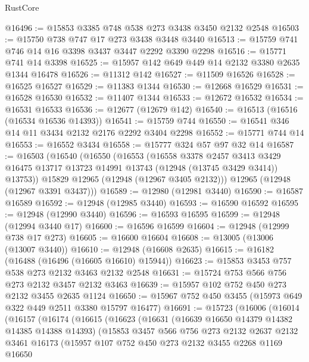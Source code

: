\begin{lexlean}{RustCore}
\begin{coremodule}
@16496 := @15853 @3385 @748 @538 @273 @3438 @3450 @2132 @2548
@16503 := @15750 @738 @747 @17 @273 @3438 @3448 @3440
@16513 := @15759 @741 @746 @14 @16 @3398 @3437 @3447 @2292 @3390 @2298
@16516 := @15771 @741 @14 @3398
@16525 := @15957 @142 @649 @449 @14 @2132 @3380 @2635 @1344 @16478
@16526 := @11312 @142
@16527 := @11509 @16526
@16528 := @16525 @16527
@16529 := @11383 @1344
@16530 := @12668 @16529
@16531 := @16528 @16530
@16532 := @11407 @1344
@16533 := @12672 @16532
@16534 := @16531 @16533
@16536 := @12677 (@12679 @142)
@16540 := @16513 (@16516 (@16534 @16536 @14393))
@16541 := @15759 @744
@16550 := @16541 @346 @14 @11 @3434 @2132 @2176 @2292 @3404 @2298
@16552 := @15771 @744 @14
@16553 := @16552 @3434
@16558 := @15777 @324 @57 @97 @32 @14
@16587 := @16503
    (@16540
      (@16550
        (@16553
          (@16558
            @3378
            @2457
            @3413
            @3429
            @16475
            @13717
            @13723
            @14991
            @13743
            (@12948 (@13745 @3429 @3414))
            @13753))
        @15829
        @12965
        (@12948 (@12967 @3405 @2132)))
      @12965
      (@12948 (@12967 @3391 @3437)))
@16589 := @12980 (@12981 @3440)
@16590 := @16587 @16589
@16592 := @12948 (@12985 @3440)
@16593 := @16590 @16592
@16595 := @12948 (@12990 @3440)
@16596 := @16593 @16595
@16599 := @12948 (@12994 @3440 @17)
@16600 := @16596 @16599
@16604 := @12948 (@12999 @738 @17 @273)
@16605 := @16600 @16604
@16608 := @13005 (@13006 (@13007 @3440))
@16610 := @12948 (@16608 @2635)
@16615 := @16182 (@16488 (@16496 (@16605 @16610) @15944))
@16623 := @15853 @3453 @757 @538 @273 @2132 @3463 @2132 @2548
@16631 := @15724 @753 @566 @756 @273 @2132 @3457 @2132 @3463
@16639 := @15957 @102 @752 @450 @273 @2132 @3455 @2635 @1124
@16650 := @15967 @752 @450 @3455 (@15973 @649 @322 @449 @2511 @3380 @15797 @16477)
@16691 := @15723
    (@16006
      (@16014
        (@16157
          (@16174
            (@16615
              (@16623
                (@16631
                  (@16639 @16650 @14379 @14382 @14385 @14388 @14393)
                  (@15853
                    @3457
                    @566
                    @756
                    @273
                    @2132
                    @2637
                    @2132
                    @3461
                    @16173
                    (@15957
                      @107
                      @752
                      @450
                      @273
                      @2132
                      @3455
                      @2268
                      @1169
                      @16650

\end{coremodule}
\end{lexlean}
